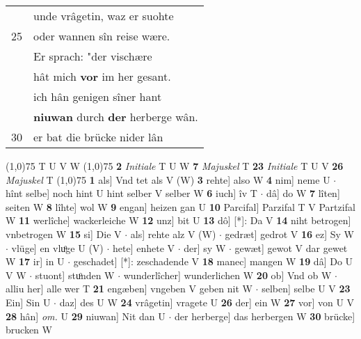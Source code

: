 \documentclass[8pt,a4paper,notitlepage]{article}
\begin{document}
\begin{table}[ht]
\begin{minipage}[t]{0.5\linewidth}
\begin{tabular}{rl}
 & unde vrâgetin, waz er suohte\\ 
25 & oder wannen sîn reise wære.\\ 
 & Er sprach: "der vischære\\ 
 & hât mich \textbf{vor} im her gesant.\\ 
 & ich hân genigen sîner hant\\ 
 & \textbf{niuwan} durch \textbf{der} herberge wân.\\ 
30 & er bat die brücke nider lân\\ 
\end{tabular}
\scriptsize
\line(1,0){75} \newline
T U V W \newline
\line(1,0){75} \newline
\textbf{2} \textit{Initiale} T U W  \textbf{7} \textit{Majuskel} T  \textbf{23} \textit{Initiale} T U V  \textbf{26} \textit{Majuskel} T  \newline
\line(1,0){75} \newline
\textbf{1} als] Vnd tet als V (W) \textbf{3} rehte] also W \textbf{4} nim] neme U  $\cdot$ hînt selbe] noch hint U hint selber V selber W \textbf{6} iuch] îv T  $\cdot$ dâ] do W \textbf{7} lîten] seiten W \textbf{8} lîhte] wol W \textbf{9} engan] heizen gan U \textbf{10} Parcifal] Parzifal T V Partzifal W \textbf{11} werlîche] wackerleiche W \textbf{12} unz] bit U \textbf{13} dô] [*]: Da V \textbf{14} niht betrogen] vnbetrogen W \textbf{15} si] Die V  $\cdot$ als] rehte alz V (W)  $\cdot$ gedræt] gedrot V \textbf{16} ez] Sy W  $\cdot$ vlüge] en vluͦge U (V)  $\cdot$ hete] enhete V  $\cdot$ der] sy W  $\cdot$ gewæt] gewot V dar gewet W \textbf{17} ir] in U  $\cdot$ geschadet] [*]: zeschadende V \textbf{18} manec] mangen W \textbf{19} dâ] Do U V W  $\cdot$ stuont] stuͦnden W  $\cdot$ wunderlîcher] wunderlichen W \textbf{20} ob] Vnd ob W  $\cdot$ alliu her] alle wer T \textbf{21} engæben] vngeben V geben nit W  $\cdot$ selben] selbe U V \textbf{23} Ein] Sin U  $\cdot$ daz] des U W \textbf{24} vrâgetin] vragete U \textbf{26} der] ein W \textbf{27} vor] von U V \textbf{28} hân] \textit{om.} U \textbf{29} niuwan] Nit dan U  $\cdot$ der herberge] das herbergen W \textbf{30} brücke] brucken W \newline
\end{minipage}
\end{table}
\end{document}
